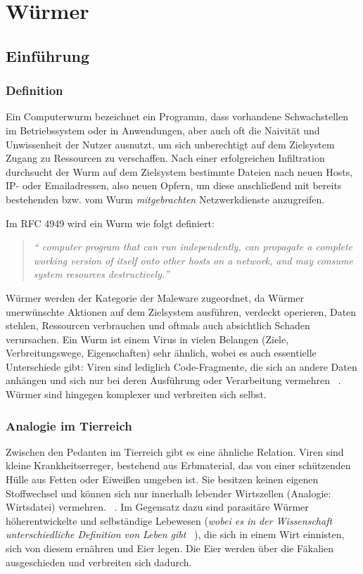 \section{Würmer}
\label{compositions:wuermer}

\subsection{Einführung}

\subsubsection {Definition}

Ein Computerwurm bezeichnet ein Programm, dass vorhandene
Schwachstellen im Betriebssystem oder in Anwendungen, aber auch oft
die Naivität und Unwissenheit der Nutzer ausnutzt, um sich
unberechtigt auf dem Zielsystem Zugang zu Ressourcen zu
verschaffen. Nach einer erfolgreichen Infiltration durchsucht der Wurm
auf dem Zielsystem bestimmte Dateien nach neuen Hosts, IP- oder
Emailadressen, also neuen Opfern, um diese anschließend mit bereits
bestehenden bzw. vom Wurm \textit{mitgebrachten} Netzwerkdienste
anzugreifen.

Im RFC 4949 wird ein Wurm wie folgt definiert:

\begin{quote} \itshape \foreignquote{english}{ computer program that
can run independently, can propagate a complete working version of
itself onto other hosts on a network, and may consume system resources
destructively.}  ~\cite{wuermer-rfc4949}
\end{quote}

Würmer werden der Kategorie der Maleware zugeordnet, da Würmer
unerwünschte Aktionen auf dem Zielsystem ausführen, verdeckt
operieren, Daten stehlen, Ressourcen verbrauchen und oftmals auch
absichtlich Schaden verursachen. Ein Wurm ist einem Virus in vielen
Belangen (Ziele, Verbreitungswege, Eigenschaften) sehr ähnlich, wobei
es auch essentielle Unterschiede gibt: Viren sind lediglich
Code-Fragmente, die sich an andere Daten anhängen und sich nur bei
deren Ausführung oder Verarbeitung vermehren
~\cite{wuermer-viren}. Würmer sind hingegen komplexer und verbreiten
sich selbst.

\subsubsection {Analogie im Tierreich}

Zwischen den Pedanten im Tierreich gibt es eine ähnliche
Relation. Viren sind kleine Krankheitserreger, bestehend aus
Erbmaterial, das von einer schützenden Hülle aus Fetten oder Eiweißen
umgeben ist. Sie besitzen keinen eigenen Stoffwechsel und können sich
nur innerhalb lebender Wirtszellen (Analogie: Wirtsdatei)
vermehren. ~\cite{wuermer-bioviren}.  Im Gegensatz dazu sind
parasitäre Würmer höherentwickelte und selbständige Lebewesen
(\textit{wobei es in der Wissenschaft unterschiedliche Definition von
Leben gibt} ~\cite{wuermer-leben}), die sich in einem Wirt einnisten,
sich von diesem ernähren und Eier legen. Die Eier werden über die
Fäkalien ausgeschieden und verbreiten sich dadurch.

